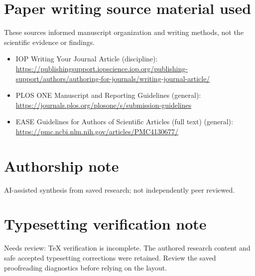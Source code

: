 \documentclass[11pt]{article}
\begin{document}
\section*{Paper writing source material used}
These sources informed manuscript organization and writing methods, not the scientific evidence or findings.
\begin{itemize}
\item IOP \textemdash{} Writing Your Journal Article (discipline): \url{https://publishingsupport.iopscience.iop.org/publishing-support/authors/authoring-for-journals/writing-journal-article/}
\item PLOS ONE \textemdash{} Manuscript and Reporting Guidelines (general): \url{https://journals.plos.org/plosone/s/submission-guidelines}
\item EASE \textemdash{} Guidelines for Authors of Scientific Articles (full text) (general): \url{https://pmc.ncbi.nlm.nih.gov/articles/PMC4130677/}
\end{itemize}
\section*{Authorship note}
AI-assisted synthesis from saved research; not independently peer reviewed.
\section*{Typesetting verification note}
Needs review: TeX verification is incomplete. The authored research content and safe accepted typesetting corrections were retained. Review the saved proofreading diagnostics before relying on the layout.
\end{document}
